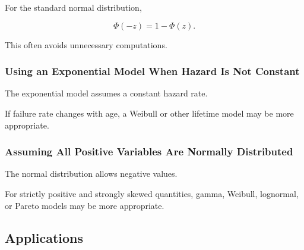 For the standard normal distribution,

\[
\boxed{
\Phi(-z)=1-\Phi(z).
}
\]

This often avoids unnecessary computations.

\subsubsection{Using an Exponential Model When Hazard Is Not Constant}

The exponential model assumes a constant hazard rate.

If failure rate changes with age, a Weibull or other lifetime model may
be more appropriate.

\subsubsection{Assuming All Positive Variables Are Normally Distributed}

The normal distribution allows negative values.

For strictly positive and strongly skewed quantities, gamma, Weibull,
lognormal, or Pareto models may be more appropriate.

\subsection{Applications}
\label{subsec:continuous-distributions-applications}

